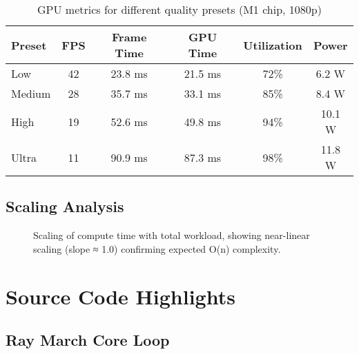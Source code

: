\documentclass[12pt,a4paper]{article}
\theoremstyle{definition}
\theoremstyle{remark}
\begin{document}
\begin{table}[H]
\centering
\caption{GPU metrics for different quality presets (M1 chip, 1080p)}
\begin{tabular}{lccccc}
\toprule
\textbf{Preset} & \textbf{FPS} & \textbf{Frame Time} & \textbf{GPU Time} & \textbf{Utilization} & \textbf{Power} \\
\midrule
Low & 42 & 23.8 ms & 21.5 ms & 72\% & 6.2 W \\
Medium & 28 & 35.7 ms & 33.1 ms & 85\% & 8.4 W \\
High & 19 & 52.6 ms & 49.8 ms & 94\% & 10.1 W \\
Ultra & 11 & 90.9 ms & 87.3 ms & 98\% & 11.8 W \\
\bottomrule
\end{tabular}
\label{tab:gpu_metrics}
\end{table}

\subsection{Scaling Analysis}

\begin{figure}[H]
    \centering
    \caption{Scaling of compute time with total workload, showing near-linear scaling (slope ≈ 1.0) confirming expected O(n) complexity.}
    \label{fig:scaling_analysis}
\end{figure}

\section{Source Code Highlights}

\subsection{Ray March Core Loop}
\end{document}
